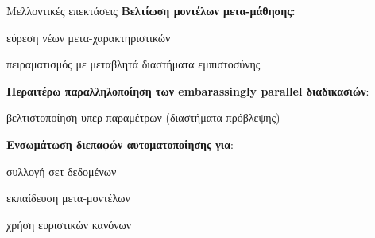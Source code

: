 \documentclass{beamer}
\newcommand{\bigqm}[1][1]{\text{\larger[#1]{\textbf{?}}}}
\begin{document}
  \begin{frame}{Μελλοντικές επεκτάσεις} 
  	\textbf{Βελτίωση μοντέλων μετα-μάθησης:}
  	\begin{itemize}
  		{\small
  			 \item εύρεση νέων μετα-χαρακτηριστικών
  			\item πειραματισμός με μεταβλητά διαστήματα εμπιστοσύνης}
  		
  		\end{itemize}  	
  		
  	\textbf{Περαιτέρω παραλληλοποίηση των embarassingly parallel διαδικασιών}:
  	\begin{itemize}
  		{\small
  		\item βελτιστοποίηση υπερ-παραμέτρων (διαστήματα πρόβλεψης)}
  		 
  	\end{itemize}  	   	  	
  	\textbf{Ενσωμάτωση διεπαφών αυτοματοποίησης για}:
  	\begin{itemize}
  		{\small
  			\item συλλογή σετ δεδομένων
  			\item εκπαίδευση μετα-μοντέλων
  			\item χρήση ευριστικών κανόνων}  		
  	\end{itemize}
  \end{frame}  
  \begin{frame}[standout]{} 
    \begin{center}
    	  	\scalebox{2}{
    $\bigqm[7]$}
    \end{center}
  \end{frame} 
\end{document}
